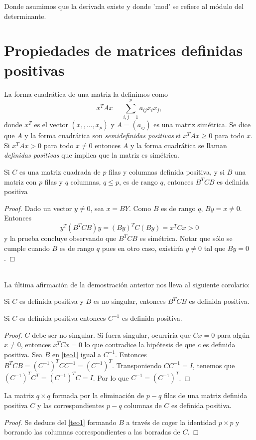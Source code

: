 Donde asumimos que la derivada existe y donde 'mod' se refiere al módulo del determinante. \\
\cite{anderson1958introduction}
\section{Propiedades de matrices definidas positivas}
La forma cuadrática de una matriz la definimos como 
\[x^TAx=\sum_{i,j=1}^p a_{ij}x_ix_j, \]
donde $x^T$ es el vector $(x_1,...,x_p)$ y $A=(a_{ij})$ es una matriz simétrica. Se dice que $A$ y la forma cuadrática son \textit{semidefinidas positivas} si $x^TAx \geq 0$ para todo $x$. Si $x^TAx > 0$ para todo $x \neq 0$ entonces $A$ y la forma cuadrática se llaman \textit{definidas positivas} que implica que la matriz es simétrica.
\begin{teorema}\label{teo1}
Si $C$ es una matriz cuadrada de $p$ filas y columnas definida positiva, y si $B$ una matriz con $p$ filas y $q$ columnas, $q \leq p$, es de rango $q$, entonces $B^TCB$ es definida positiva
\end{teorema}
\begin{proof}
Dado un vector $y\neq0$, sea $x=BY$. Como $B$ es de rango $q$, $By=x\neq 0$. Entonces
\[ y^T(B^TCB)y=(By)^TC(By)=x^TCx>0 \]
y la prueba concluye observando que  $B^TCB$ es simétrica. Notar que sólo se cumple cuando $B$ es de rango $q$ pues en otro caso, existiría $y \neq 0$ tal que $By=0$.
\end{proof}
\cite{anderson1958introduction}\\
La última afirmación de la demostración anterior nos lleva al siguiente corolario:
\begin{corolario}
Si $C$ es definida positiva y $B$ es no singular, entonces $B^TCB$ es definida positiva.
\end{corolario}
\begin{corolario}
Si $C$ es definida positiva entonces $C^{-1}$ es definida positiva.
\end{corolario}
\begin{proof}
$C$ debe ser no singular. Si fuera singular, ocurriría que $Cx=0$ para algún $x \neq 0$, entonces $x^TCx=0$ lo que contradice la hipótesis de que $c$ es definida positiva. Sea $B$ en \autoref{teo1} igual a $C^{-1}$. Entonces $B^TCB=(C^{-1})^TCC^{-1}=(C^{-1})^T$. Transponiendo $CC^{-1}=I$, tenemos que $(C^{-1})^TC^T=(C^{-1})^TC=I$. Por lo que $C^{-1}=(C^{-1})^T$.
\end{proof}

\begin{corolario}
La matriz $q \times q$ formada por la eliminación de $p-q$ filas de una matriz definida positiva $C$ y las correspondientes $p-q$ columnas de $C$ es definida positiva.
\end{corolario}
\begin{proof}
Se deduce del \autoref{teo1} formando $B$ a través de coger la identidad $p \times p$ y borrando las columnas correspondientes a las borradas de $C$.
\end{proof}

